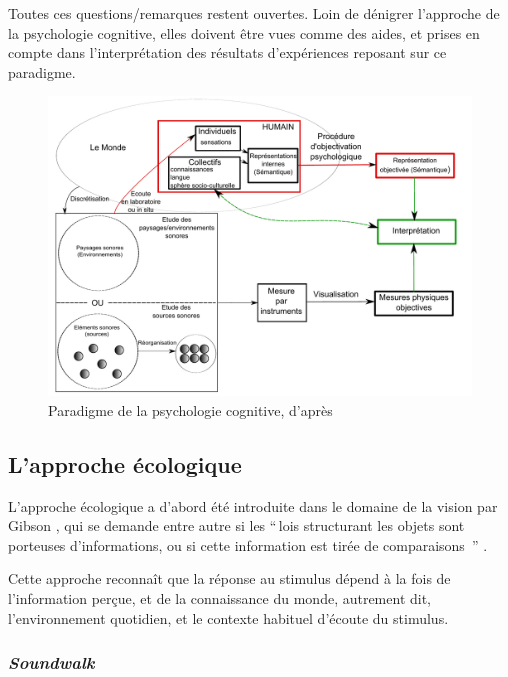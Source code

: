 {Toutes ces questions/remarques restent ouvertes. Loin de dénigrer l'approche de la psychologie cognitive, elles doivent être vues comme des aides, et prises en compte dans l'interprétation des résultats d'expériences reposant sur ce paradigme.


\begin{figure}[t]
        \myfloatalign
        \includegraphics[width=\linewidth]{gfx/ch_3/Shema_maffiolo}
        \caption[Paradigme de la psychologie cognitive]{Paradigme de la psychologie cognitive, d'après \citep{maffiolo_caracterisation_1999}}\label{fig:paradigmePsychoCo}
\end{figure}

\subsection{L'approche écologique}
\label{sec:ch3_ecologique}

L'approche écologique a d'abord été introduite dans le domaine de la vision par Gibson \citep{gibson1966senses}, qui se demande entre autre si les ``\,lois structurant les objets sont porteuses d'informations, ou si cette information est tirée de comparaisons \,'' \citep{gibson1978ecological}.

Cette approche reconnaît que la réponse au stimulus dépend à la fois de l'information perçue, et de la connaissance du monde, autrement dit, l'environnement quotidien, et le contexte habituel d'écoute du stimulus.

\subsubsection{\emph{Soundwalk}}

}
